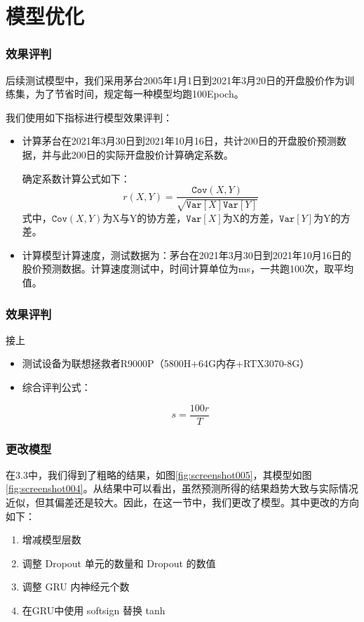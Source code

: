 \documentclass[aspectratio=169, 10pt, utf8, mathserif]{beamer}
\begin{document}
\section{模型优化}
\begin{frame}
	\frametitle{效果评判}
	后续测试模型中，我们采用茅台2005年1月1日到2021年3月20日的开盘股价作为训练集，为了节省时间，规定每一种模型均跑100Epoch。
	
	我们使用如下指标进行模型效果评判：
	\begin{itemize}
		\item 计算茅台在2021年3月30日到2021年10月16日，共计200日的开盘股价预测数据，并与此200日的实际开盘股价计算确定系数。
		
		确定系数计算公式如下：
		\begin{equation}\label{r}
			r(X,Y)=\dfrac{\texttt{Cov}(X,Y)}{\sqrt{\texttt{Var}[X]\texttt{Var}[Y]}}
		\end{equation}
		式中，$ \texttt{Cov}(X,Y) $为X与Y的协方差，$ \texttt{Var}[X] $为X的方差，$ \texttt{Var}[Y] $为Y的方差。
		\item 计算模型计算速度，测试数据为：茅台在2021年3月30日到2021年10月16日的股价预测数据。计算速度测试中，时间计算单位为ms，一共跑100次，取平均值。
	
	\end{itemize}
\end{frame}	
\begin{frame}
	\frametitle{效果评判}
	接上
	\begin{itemize}
			\item 测试设备为联想拯救者R9000P（5800H+64G内存+RTX3070-8G）
		
		\item 综合评判公式：
		
		\begin{equation}\label{pingpan}
			s=\dfrac{100r}{T}
		\end{equation}
	\end{itemize}
\end{frame}	
\begin{frame}
	\frametitle{更改模型}
	在3.3中，我们得到了粗略的结果，如图\ref{fig:screenshot005}，其模型如图\ref{fig:screenshot004}。从结果中可以看出，虽然预测所得的结果趋势大致与实际情况近似，但其偏差还是较大。因此，在这一节中，我们更改了模型。其中更改的方向如下：
	
	\begin{enumerate}
		\item 增减模型层数
		\item 调整 Dropout 单元的数量和 Dropout 的数值
		\item 调整 GRU 内神经元个数
		\item 在GRU中使用 softsign 替换 tanh 
	\end{enumerate}
\end{frame}	
\end{document}
